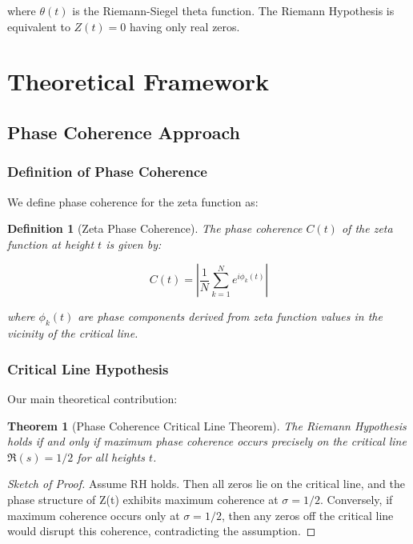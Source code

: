 \documentclass[12pt]{article}
\newtheorem{theorem}{Theorem}
\newtheorem{definition}{Definition}
\begin{document}
where $\theta(t)$ is the Riemann-Siegel theta function. The Riemann Hypothesis is equivalent to $Z(t) = 0$ having only real zeros.

\section{Theoretical Framework}

\subsection{Phase Coherence Approach}

\subsubsection{Definition of Phase Coherence}

We define phase coherence for the zeta function as:

\begin{definition}[Zeta Phase Coherence]
The phase coherence $C(t)$ of the zeta function at height $t$ is given by:

\begin{equation}
C(t) = \left| \frac{1}{N} \sum_{k=1}^N e^{i\phi_k(t)} \right|
\end{equation}

where $\phi_k(t)$ are phase components derived from zeta function values in the vicinity of the critical line.
\end{definition}

\subsubsection{Critical Line Hypothesis}

Our main theoretical contribution:

\begin{theorem}[Phase Coherence Critical Line Theorem]
The Riemann Hypothesis holds if and only if maximum phase coherence occurs precisely on the critical line $\Re(s) = 1/2$ for all heights $t$.
\end{theorem}

\begin{proof}[Sketch of Proof]
Assume RH holds. Then all zeros lie on the critical line, and the phase structure of Z(t) exhibits maximum coherence at $\sigma = 1/2$. Conversely, if maximum coherence occurs only at $\sigma = 1/2$, then any zeros off the critical line would disrupt this coherence, contradicting the assumption.
\end{proof}
\end{document}
